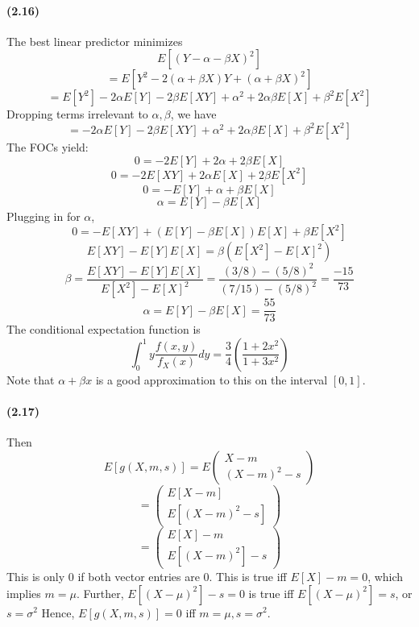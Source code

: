 \documentclass[10pt,letter]{article}
\begin{document}
\paragraph{(2.16)} The best linear predictor minimizes
\[ E[(Y - \alpha - \beta X)^2]  \]
\[ =E[Y^2 - 2(\alpha + \beta X)Y + (\alpha + \beta X)^2] \]
\[ =E[Y^2] - 2\alpha E[Y] - 2 \beta E[XY] + \alpha^2 + 2 \alpha \beta E[X] + \beta^2 E[X^2] \]
Dropping terms irrelevant to $\alpha, \beta$, we have
\[ = - 2\alpha E[Y] - 2 \beta E[XY] + \alpha^2 + 2 \alpha \beta E[X] + \beta^2 E[X^2] \]
The FOCs yield:
\[ 0 = -2 E[Y] + 2\alpha + 2\beta E[X] \]
\[ 0 = -2 E[XY] + 2\alpha E[X] + 2 \beta E[X^2] \]
\[ 0 = - E[Y] + \alpha + \beta E[X] \]
\[ \alpha = E[Y] - \beta E[X] \]
Plugging in for $\alpha$,
\[ 0 = - E[XY] + (E[Y] - \beta E[X]) E[X] + \beta E[X^2] \]
\[ E[XY] - E[Y]E[X] = \beta (E[X^2] - E[X]^2) \]
\[ \beta = \frac{E[XY] - E[Y]E[X]}{E[X^2] - E[X]^2} = \frac{(3/8)  - (5/8)^2 }{(7/15) - (5/8)^2} = \frac{-15}{73}\]
\[ \alpha = E[Y] - \beta E[X] = \frac{55}{73}\]
The conditional expectation function is
\[ \int_0^1 y\frac{f(x,y)}{f_X(x)} dy = \frac{3}{4} \left(\frac{1 + 2x^2}{1+3x^2}\right)\]
Note that $\alpha + \beta x$ is a good approximation to this on the interval $[0,1]$.
\paragraph{(2.17)}
Then
\[ E[g(X, m, s)] = E\begin{pmatrix} X - m \\ (X-m)^2 - s \end{pmatrix} \]
\[= \begin{pmatrix} E[X - m] \\ E[(X-m)^2 - s] \end{pmatrix} \]
\[= \begin{pmatrix} E[X] - m \\ E[(X-m)^2] - s \end{pmatrix} \]
This is only 0 if both vector entries are 0. This is true iff $E[X] - m = 0$, which implies $m = \mu$. Further, $E[(X-\mu)^2] - s = 0$ is true iff $E[(X - \mu)^2] = s$, or $s = \sigma^2$
Hence, $E[g(X, m, s)] = 0 $ iff $m = \mu, s = \sigma^2$.
\end{document}
